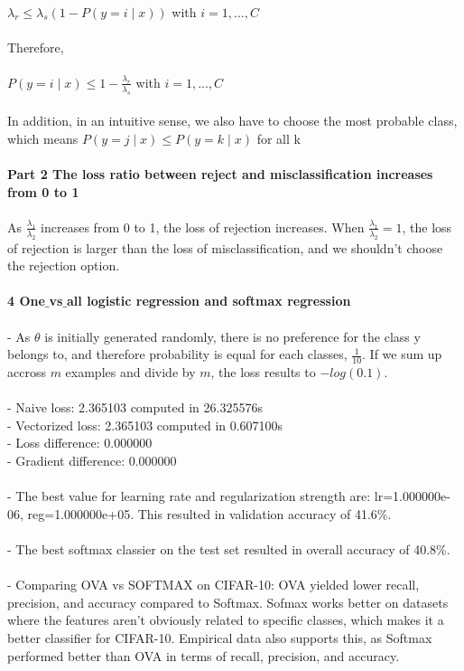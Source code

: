 \documentclass[12pt]{article}
\begin{document}
\\
\indent $\lambda_r \leq \lambda_s (1 - P(y = i \mid x)) $ with $ i = 1, ..., C$\\
\\
Therefore, \\
\\
\indent $P(y = i \mid x) \leq 1 - \frac {\lambda_r}{\lambda_s} $ with $i =  1 , ... ,  C$\\
\\
In addition, in an intuitive sense, we also have to choose the most probable class, which means $P(y = j \mid x) \leq P(y = k \mid x)$ for all k
\\ 
\\
\noindent \textbf{Part 2 The loss ratio between reject and misclassification increases from 0 to 1}
\\
\\
As $\frac {\lambda_1} {\lambda_2}$ increases from 0 to 1, the loss of rejection increases. When $\frac {\lambda_1} {\lambda_2}= 1$, the loss of rejection is larger than the loss of misclassification, and we shouldn't choose the rejection option.\\
\\
\noindent \textbf{4 One$\_$vs$\_$all logistic regression and softmax regression}\\
\\
- As $\theta$ is initially generated randomly, there is no preference for the class y belongs to, and therefore probability is equal for each classes, $\frac{1}{10}$. If we sum up accross $m$ examples and divide by $m$, the loss results to $-log(0.1)$.\\
\\
- Naive loss: 2.365103 computed in 26.325576s\\
- Vectorized loss: 2.365103 computed in 0.607100s
\\
- Loss difference: 0.000000
\\
- Gradient difference: 0.000000\\
\\
- The best value for learning rate and regularization strength are:
lr=1.000000e-06, reg=1.000000e+05. This resulted in validation accuracy of 41.6$\%$. \\
\\
- The best softmax classier on the test set resulted in overall accuracy of  40.8$\%$. \\
\\
- Comparing OVA vs SOFTMAX on CIFAR-10: OVA yielded lower recall, precision, and accuracy compared to Softmax. Sofmax works better on datasets where the features aren't obviously related to specific classes, which makes it a better classifier for CIFAR-10. Empirical data also supports this, as Softmax performed better than OVA in terms of recall, precision, and accuracy.
\\
\end{document}
